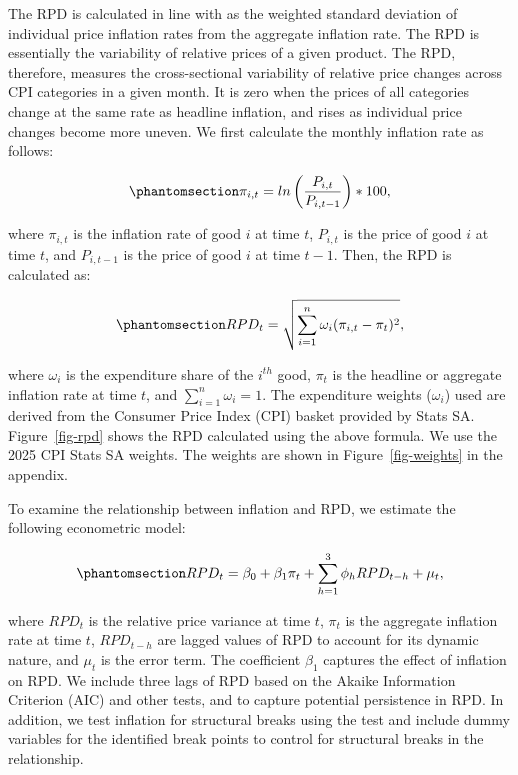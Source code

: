 \documentclass[
  letterpaper,
  DIV=11,
  numbers=noendperiod]{scrartcl}
\begin{document}
The RPD is calculated in line with \citet{lach1992} as the weighted
standard deviation of individual price inflation rates from the
aggregate inflation rate. The RPD is essentially the variability of
relative prices of a given product. The RPD, therefore, measures the
cross-sectional variability of relative price changes across CPI
categories in a given month. It is zero when the prices of all
categories change at the same rate as headline inflation, and rises as
individual price changes become more uneven. We first calculate the
monthly inflation rate as follows:

\begin{equation}\phantomsection\label{eq-inflation_rate}{ \pi_{i,t} = ln\left(\frac{P_{i,t}}{P_{i,t-1}}\right) * 100, }\end{equation}

where \(\pi_{i,t}\) is the inflation rate of good \(i\) at time \(t\),
\(P_{i,t}\) is the price of good \(i\) at time \(t\), and \(P_{i,t-1}\)
is the price of good \(i\) at time \(t-1\). Then, the RPD is calculated
as:

\begin{equation}\phantomsection\label{eq-rpd}{RPD_{t} = \sqrt{\sum_{i=1}^{n}\omega_{i}(\pi_{i,t} - \pi_{t})^2}, }\end{equation}

where \(\omega_{i}\) is the expenditure share of the \(i^{th}\) good,
\(\pi_{t}\) is the headline or aggregate inflation rate at time \(t\),
and \(\sum_{i=1}^{n}\omega_{i} = 1\). The expenditure weights
(\(\omega_{i}\)) used are derived from the Consumer Price Index (CPI)
basket provided by Stats SA. Figure~\ref{fig-rpd} shows the RPD
calculated using the above formula. We use the 2025 CPI Stats SA
weights. The weights are shown in Figure~\ref{fig-weights} in the
appendix.

To examine the relationship between inflation and RPD, we estimate the
following econometric model:

\begin{equation}\phantomsection\label{eq-rpd_reg}{RPD_{t} = \beta_0 + \beta_1\pi_{t} + \sum_{h=1}^{3}\phi_hRPD_{t-h}  +  \mu_{t}, }\end{equation}

where \(RPD_{t}\) is the relative price variance at time \(t\),
\(\pi_{t}\) is the aggregate inflation rate at time \(t\), \(RPD_{t-h}\)
are lagged values of RPD to account for its dynamic nature, and
\(\mu_{t}\) is the error term. The coefficient \(\beta_1\) captures the
effect of inflation on RPD. We include three lags of RPD based on the
Akaike Information Criterion (AIC) and other tests, and to capture
potential persistence in RPD. In addition, we test inflation for
structural breaks using the \citet{bai1998a} test and include dummy
variables for the identified break points to control for structural
breaks in the relationship.
\end{document}

